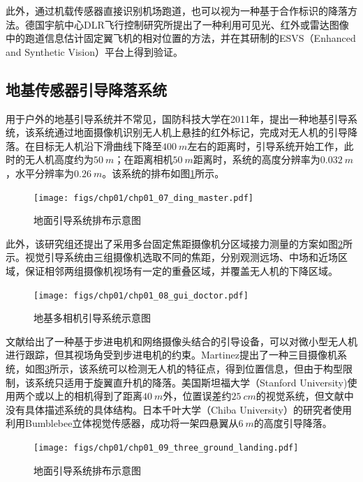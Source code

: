 此外，通过机载传感器直接识别机场跑道，也可以视为一种基于合作标识的降落方法。德国宇航中心DLR飞行控制研究所提出了一种利用可见光、红外或雷达图像中的跑道信息估计固定翼飞机的相对位置的方法，并在其研制的ESVS（Enhanced and Synthetic Vision）平台上得到验证\cite{doehler2003robust}。

\subsection{地基传感器引导降落系统} 

用于户外的地基引导系统并不常见，国防科技大学在2011年，提出一种地基引导系统\cite{Ding_master_2011}，该系统通过地面摄像机识别无人机上悬挂的红外标记，完成对无人机的引导降落。在目标无人机沿下滑曲线下降至$400\ m$左右的距离时，引导系统开始工作，此时的无人机高度约为$50\ m$；在距离相机$50\ m$距离时，系统的高度分辨率为$0.032\ m$，水平分辨率为$0.26\ m$。该系统的排布如图\ref{fig:chp01_07_ding_master}所示。

\begin{figure}[htb]   
	\centering
	\texttt{[image: figs/chp01/chp01\_07\_ding\_master.pdf]}
	\caption{地面引导系统排布示意图}
	\label{fig:chp01_07_ding_master}
\end{figure}

此外，该研究组还提出了采用多台固定焦距摄像机分区域接力测量的方案如图\ref{fig:chp01_08_gui_doctor}所示\cite{gui_doctor_2013}。视觉引导系统由三组摄像机选取不同的焦距，分别观测远场、中场和近场区域，保证相邻两组摄像机视场有一定的重叠区域，并覆盖无人机的下降区域。

\begin{figure}[htb]   
	\centering
	\texttt{[image: figs/chp01/chp01\_08\_gui\_doctor.pdf]}
	\caption{地基多相机引导系统示意图}
	\label{fig:chp01_08_gui_doctor}
\end{figure}

文献\cite{Garcia-Pardo2002}给出了一种基于步进电机和网络摄像头结合的引导设备，可以对微小型无人机进行跟踪，但其视场角受到步进电机的约束。Martinez\cite{Martinez2010}提出了一种三目摄像机系统，如图\ref{fig:chp01_09_three_ground_landing}所示，该系统可以检测无人机的特征点，得到位置信息，但由于构型限制，该系统只适用于旋翼直升机的降落。美国斯坦福大学（Stanford University)\cite{Saripalli2003}使用两个或以上的相机得到了距离$40\ m$外，位置误差约$25\ cm$的视觉系统，但文献中没有具体描述系统的具体结构。日本千叶大学（Chiba University）的研究者\cite{PEBRIANTI2010}使用利用Bumblebee立体视觉传感器，成功将一架四悬翼从$6\ m$的高度引导降落。

\begin{figure}[htb]   
	\centering
	\texttt{[image: figs/chp01/chp01\_09\_three\_ground\_landing.pdf]}
	\caption{地面引导系统排布示意图}
	\label{fig:chp01_09_three_ground_landing}
\end{figure}

